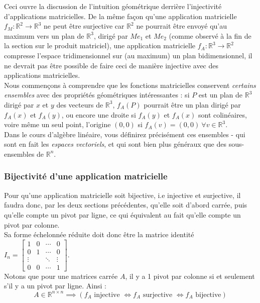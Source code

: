 \documentclass{article}
\newcommand{\R}{\mathbb{R}}
\begin{document}
\noindent Ceci ouvre la discussion de l'intuition géométrique derrière l'injectivité d'applications matricielles. De la même façon qu'une application matricielle $f_M : \R^2 \to \R^3$ ne peut être surjective car $\R^2$ ne pourrait être envoyé qu'au maximum vers un plan de $\R^3$, dirigé par $Me_1$ et $Me_2$ (comme observé à la fin de la section sur le produit matriciel), une application matricielle $f_A: \R^3 \to \R^2$ compresse l'espace tridimensionnel sur (au maximum) un plan bidimensionnel, il ne devrait pas être possible de faire ceci de manière injective avec des applications matricielles.\\

\noindent Nous commençons à comprendre que les fonctions matricielles conservent \textit{certains ensembles} avec des propriétés géométriques intéressantes : si $P$ est un plan de $\R^3$ dirigé par $x$ et $y$ des vecteurs de $\R^3$, $f_A(P)$ pourrait être un plan dirigé par $f_A(x)$ et $f_A(y)$, ou encore une droite si $f_A(y)$ et $f_A(x)$ sont colinéaires, voire même un seul point, l'origine $(0,0)$ si $f_A(v) = (0,0)\ \forall v \in \R^3$.\\

\noindent Dans le cours d'algèbre linéaire, vous définirez précisément ces ensembles - qui sont en fait les \textit{espaces vectoriels}, et qui sont bien plus généraux que des sous-ensembles de $\R^n$.

\subsubsection{Bijectivité d'une application matricielle}
\noindent Pour qu'une application matricielle soit bijective, i.e injective et surjective, il faudra donc, par les deux sections précédentes, qu'elle soit d'abord carrée, puis qu'elle compte un pivot par ligne, ce qui équivalent au fait qu'elle compte un pivot par colonne.\\

\noindent Sa forme échelonnée réduite doit donc être la matrice identité $I_n = \begin{bmatrix}
1 & 0 & \cdots & 0 \\
0 & 1 & \cdots & 0 \\
\vdots & & \ddots& \vdots \\
0 & 0 & \cdots & 1
\end{bmatrix}$.\\
Notons que pour une matrices carrée $A$, il y a 1 pivot par colonne si et seulement s'il y a un pivot par ligne. Ainsi :
$$A \in \R^{n\times n} \implies \left(f_A \text{ injective } \iff f_A \text{ surjective } \iff f_A \text{ bijective}\right)
$$
\end{document}
